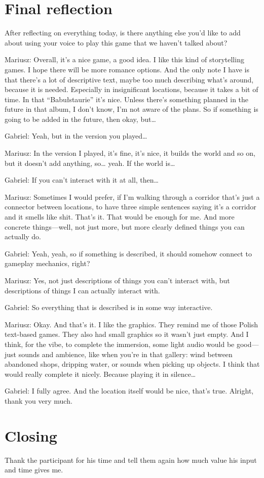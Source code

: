 \section{Final reflection}

\begin{QandA}
   \item After reflecting on everything today, is there anything else you’d like to add about using your voice to play this game that we haven't talked about?

         \begin{answered}
            Mariusz: Overall, it’s a nice game, a good idea. I like this kind of storytelling games. I hope there will be more romance options. And the only note I have is that there’s a lot of descriptive text, maybe too much describing what’s around, because it is needed. Especially in insignificant locations, because it takes a bit of time. In that “Babułstaurie” it’s nice. Unless there’s something planned in the future in that album, I don’t know, I’m not aware of the plans. So if something is going to be added in the future, then okay, but…

Gabriel: Yeah, but in the version you played…

Mariusz: In the version I played, it’s fine, it’s nice, it builds the world and so on, but it doesn’t add anything, so… yeah. If the world is…

Gabriel: If you can’t interact with it at all, then…

Mariusz: Sometimes I would prefer, if I’m walking through a corridor that’s just a connector between locations, to have three simple sentences saying it’s a corridor and it smells like shit. That’s it. That would be enough for me. And more concrete things—well, not just more, but more clearly defined things you can actually do.

Gabriel: Yeah, yeah, so if something is described, it should somehow connect to gameplay mechanics, right?

Mariusz: Yes, not just descriptions of things you can’t interact with, but descriptions of things I can actually interact with.

Gabriel: So everything that is described is in some way interactive.

Mariusz: Okay. And that’s it. I like the graphics. They remind me of those Polish text-based games. They also had small graphics so it wasn’t just empty. And I think, for the vibe, to complete the immersion, some light audio would be good—just sounds and ambience, like when you’re in that gallery: wind between abandoned shops, dripping water, or sounds when picking up objects. I think that would really complete it nicely. Because playing it in silence…

Gabriel: I fully agree. And the location itself would be nice, that’s true. Alright, thank you very much.
         \end{answered}
\end{QandA}

\section{Closing}
Thank the participant for his time and tell them again how much value his input and time gives me.






